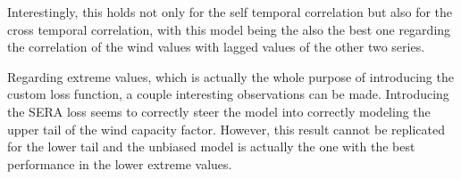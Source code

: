 Interestingly, this holds not only for the self temporal correlation but also for the cross temporal correlation, with this model being the also the best one regarding the correlation of the wind values with lagged values of the other two series. 

Regarding extreme values, which is actually the whole purpose of introducing the custom loss function, a couple interesting observations can be made. Introducing the SERA loss seems to correctly steer the model into correctly modeling the upper tail of the wind capacity factor. However, this result cannot be replicated for the lower tail and the unbiased model is actually the one with the best performance in the lower extreme values. 